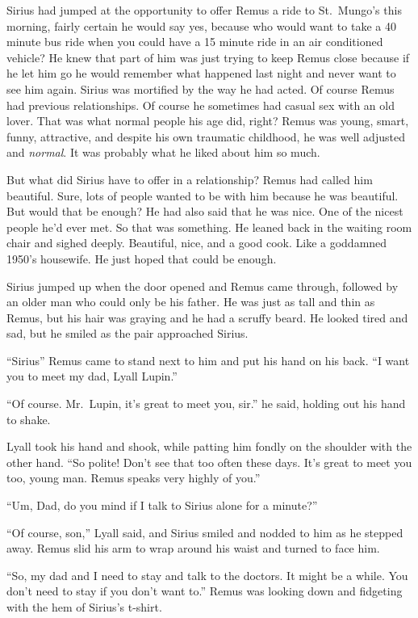 \documentclass[12pt,twoside,openright]{memoir}
\begin{document}
Sirius had jumped at the opportunity to offer Remus a ride to St.\ Mungo's this morning, fairly certain he would say yes, because who would want to take a 40 minute bus ride when you could have a 15 minute ride in an air conditioned vehicle?
He knew that part of him was just trying to keep Remus close because if he let him go he would remember what happened last night and never want to see him again. Sirius was mortified by the way he had acted. Of course Remus had previous relationships. Of course he sometimes had casual sex with an old lover. That was what normal people his age did, right?
Remus was young, smart, funny, attractive, and despite his own traumatic childhood, he was well adjusted and
\textit{normal}. It was probably what he liked about him so much. 

But what did Sirius have to offer in a relationship? Remus had called him beautiful. Sure, lots of people wanted to be with him because he was beautiful. But would that be enough? He had also said that he was nice. One of the nicest people he'd ever met. So that was something. He leaned back in the waiting room chair and sighed deeply. Beautiful, nice, and a good cook. Like a goddamned 1950's housewife. He just hoped that could be enough.

Sirius jumped up when the door opened and Remus came through, followed by an older man who could only be his father. He was just as tall and thin as Remus, but his hair was graying and he had a scruffy beard. He looked tired and sad, but he smiled as the pair approached Sirius.

``Sirius'' Remus came to stand next to him and put his hand on his back. ``I want you to meet my dad, Lyall Lupin.'' 

``Of course. Mr.\ Lupin, it's great to meet you, sir.'' he said, holding out his hand to shake. 

Lyall took his hand and shook, while patting him fondly on the shoulder with the other hand. ``So polite! Don't see that too often these days. It's great to meet you too, young man. Remus speaks very highly of you.'' 

``Um, Dad, do you mind if I talk to Sirius alone for a minute?''

``Of course, son,'' Lyall said, and Sirius smiled and nodded to him as he stepped away. Remus slid his arm to wrap around his waist and turned to face him. 

``So, my dad and I need to stay and talk to the doctors. It might be a while. You don't need to stay if you don't want to.'' Remus was looking down and fidgeting with the hem of Sirius's t-shirt.
\end{document}

